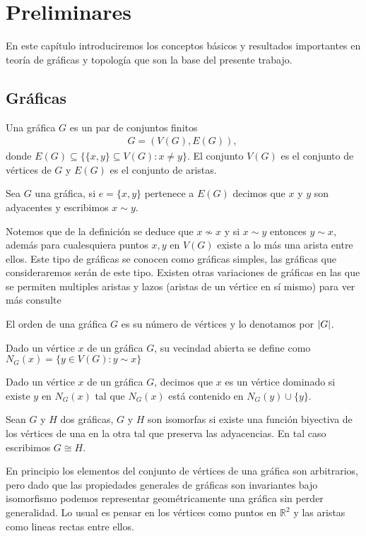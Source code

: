 \chapter{Preliminares}                %
En este capítulo introduciremos los conceptos básicos y resultados importantes en teoría de gráficas y topología que son la base del presente trabajo.
\section{Gráficas}
\begin{Defi}[Gráfica]
Una gráfica $G$ es un par de conjuntos finitos 
\begin{eqnarray*}
G=(V(G),E(G)),\
\end{eqnarray*}
donde $E(G)\subseteq \{\{x,y\}\subseteq V(G):x \neq y\}$. El conjunto $V(G)$ es el conjunto de vértices de $G$ y $E(G)$ es el conjunto de aristas.
\end{Defi}
\begin{Defi}
Sea $G$ una gráfica, si $e =\{x,y\}$ pertenece a $E(G)$ decimos que $x$ y $y$ son adyacentes y escribimos $x \sim y$.
\end{Defi}
 Notemos que de la definición se deduce que $x\nsim x$ y si $x\sim y$ entonces $y\sim x$, además para cualesquiera puntos $x,y$ en $V(G)$ existe a lo más una arista entre ellos. Este tipo de gráficas se conocen como gráficas simples, las gráficas que consideraremos serán de este tipo.  
Existen otras variaciones de gráficas en las que se permiten multiples aristas y lazos (aristas de un vértice en sí mismo) para ver más consulte \cite{Harary1969} 

\begin{Defi}
El orden de una gráfica $G$ es su número de vértices y lo denotamos por $\left| G \right|$.
\end{Defi}
\begin{Defi}
Dado un vértice $x$ de un  gráfica $G$, su vecindad abierta se define como $N_{G}(x) = \{y\in V(G): y\sim x\}$ 
\end{Defi}
\begin{Defi}
Dado un vértice $x$ de un  gráfica $G$, decimos que $x$ es un vértice dominado si existe $y$ en $N_{G}(x)$ tal que $N_{G}(x)$ está contenido en $N_{G}(y)\cup\{y\}$.
\end{Defi}

\begin{Defi}[Isomorfismo]
Sean $G$ y $H$ dos gráficas, $G$ y $H$ son isomorfas si existe una función biyectiva de los vértices de una en la otra tal que preserva las adyacencias. En tal caso escribimos $G\cong H$.
\end{Defi}
En principio los elementos del conjunto de vértices de una gráfica son arbitrarios, pero dado que las propiedades generales de gráficas son invariantes bajo isomorfismo podemos representar geométricamente una gráfica sin perder generalidad. Lo usual es pensar en los vértices como puntos en $\mathbb{R}^2$ y las aristas como lineas rectas entre ellos.

